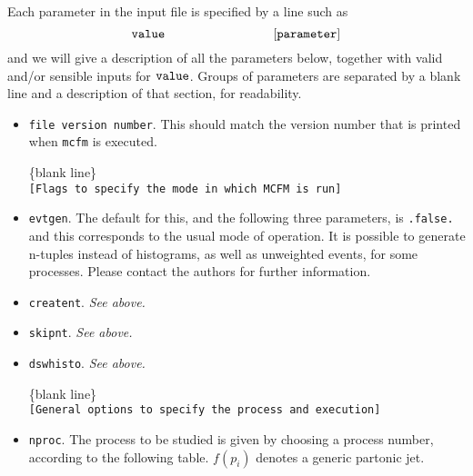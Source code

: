 \documentclass[12pt]{article}
\begin{document}
Each parameter in the input file is specified by a line such as
\begin{displaymath}
{\tt value} \hspace{3cm} {\tt [parameter]}
\end{displaymath}
and we will give a description of all the parameters below, together with
valid and/or sensible inputs for ${\tt value}$. Groups of parameters
are separated by a blank line and a description of that section, for
readability.

\begin{itemize}
\item {\tt file version number}. This should match the version number
that is printed when {\tt mcfm} is executed.

\begin{center}
\{blank line\} \\
{\tt [Flags to specify the mode in which MCFM is run] }
\end{center}

\item {\tt evtgen}. The default for this, and the following three
parameters, is {\tt .false.} and this corresponds to the usual mode
of operation. It is possible to generate n-tuples instead of histograms,
as well as unweighted events, for some processes. Please contact the
authors for further information.
\item {\tt creatent}. {\it See above.}
\item {\tt skipnt}. {\it See above.}
\item {\tt dswhisto}. {\it See above.}

\begin{center}
\{blank line\} \\
{\tt [General options to specify the process and execution] }
\end{center}

\item {\tt nproc}.
The process to be studied is given by
choosing a process number, according to the following table.
$f(p_i)$ denotes a generic partonic jet.


\end{itemize}
\end{document}
